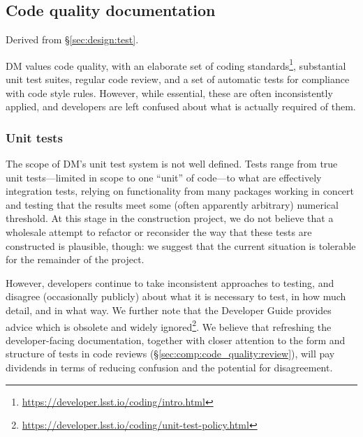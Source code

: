 \subsection{Code quality documentation}
\label{sec:comp:code_quality}

Derived from \S\ref{sec:design:test}.

DM values code quality, with an elaborate set of coding standards\footnote{\url{https://developer.lsst.io/coding/intro.html}}, substantial unit test suites, regular code review, and a set of automatic tests for compliance with code style rules.
However, while essential, these are often inconsistently applied, and developers are left confused about what is actually required of them.

\subsubsection{Unit tests}
\label{sec:comp:code_quality:unittest}

The scope of DM's unit test system is not well defined.
Tests range from true unit tests---limited in scope to one ``unit'' of code---to what are effectively integration tests, relying on functionality from many packages working in concert and testing that the results meet some (often apparently arbitrary) numerical threshold.
At this stage in the construction project, we do not believe that a wholesale attempt to refactor or reconsider the way that these tests are constructed is plausible, though: we suggest that the current situation is tolerable for the remainder of the project.

However, developers continue to take inconsistent approaches to testing, and disagree (occasionally publicly) about what it is necessary to test, in how much detail, and in what way.
We further note that the Developer Guide provides advice which is obsolete and widely ignored\footnote{\url{https://developer.lsst.io/coding/unit-test-policy.html}}.
We believe that refreshing the developer-facing documentation, together with closer attention to the form and structure of tests in code reviews (\S\ref{sec:comp:code_quality:review}), will pay dividends in terms of reducing confusion and the potential for disagreement.

